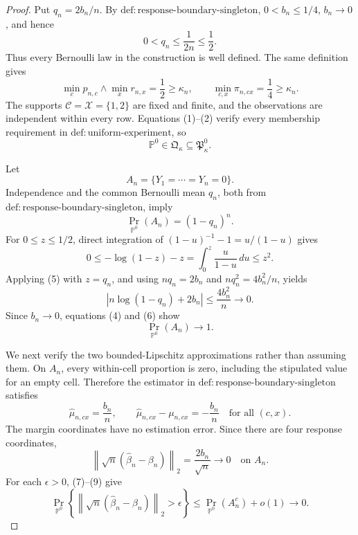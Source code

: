 \documentclass{article}
\begin{document}
\begin{proof}
Put \(q_n=2b_n/n\).  By \(\mathrm{def:response\text{-}boundary\text{-}singleton}\), \(0<b_n\leq1/4\), \(b_n\to0\), and hence
\[
0<q_n\leq\frac{1}{2n}\leq\frac12.
\tag{1}
\]
Thus every Bernoulli law in the construction is well defined.  The same definition gives
\[
\min_c p_{n,c}\wedge\min_x r_{n,x}=\frac12\geq\kappa_n,
\qquad
\min_{c,x}\pi_{n,cx}=\frac14\geq\kappa_n.
\tag{2}
\]
The supports \(\mathcal C=\mathcal X=\{1,2\}\) are fixed and finite, and the observations are independent within every row.  Equations (1)--(2) verify every membership requirement in \(\mathrm{def:uniform\text{-}experiment}\), so
\[
\mathbb P^0\in\mathfrak Q_{\kappa}\subseteq\mathfrak P_{\kappa}^{0}.
\tag{3}
\]

Let
\[
A_n=\{Y_1=\cdots=Y_n=0\}.
\]
Independence and the common Bernoulli mean \(q_n\), both from \(\mathrm{def:response\text{-}boundary\text{-}singleton}\), imply
\[
\Pr_{\mathbb P^0}(A_n)=(1-q_n)^n.
\tag{4}
\]
For \(0\leq z\leq1/2\), direct integration of \((1-u)^{-1}-1=u/(1-u)\) gives
\[
0\leq-\log(1-z)-z
=\int_0^z\frac{u}{1-u}\,du
\leq z^2.
\tag{5}
\]
Applying (5) with \(z=q_n\), and using \(nq_n=2b_n\) and \(nq_n^2=4b_n^2/n\), yields
\[
\left|n\log(1-q_n)+2b_n\right|
\leq\frac{4b_n^2}{n}\longrightarrow0.
\tag{6}
\]
Since \(b_n\to0\), equations (4) and (6) show
\[
\Pr_{\mathbb P^0}(A_n)\longrightarrow1.
\tag{7}
\]

We next verify the two bounded-Lipschitz approximations rather than assuming them.  On \(A_n\), every within-cell proportion is zero, including the stipulated value for an empty cell.  Therefore the estimator in \(\mathrm{def:response\text{-}boundary\text{-}singleton}\) satisfies
\[
\widehat\mu_{n,cx}=\frac{b_n}{n},
\qquad
\widehat\mu_{n,cx}-\mu_{n,cx}=-\frac{b_n}{n}
\quad\text{for all }(c,x).
\tag{8}
\]
The margin coordinates have no estimation error.  Since there are four response coordinates,
\[
\left\lVert\sqrt n(\widehat\beta_n-\beta_n)\right\rVert_2
=\frac{2b_n}{\sqrt n}\longrightarrow0
\quad\text{on }A_n.
\tag{9}
\]
For each \(\epsilon>0\), (7)--(9) give
\[
\Pr_{\mathbb P^0}\!\left\{
\left\lVert\sqrt n(\widehat\beta_n-\beta_n)\right\rVert_2>\epsilon
\right\}
\leq \Pr_{\mathbb P^0}(A_n^c)+o(1)
\longrightarrow0.
\tag{10}
\]


\end{proof}
\end{document}
